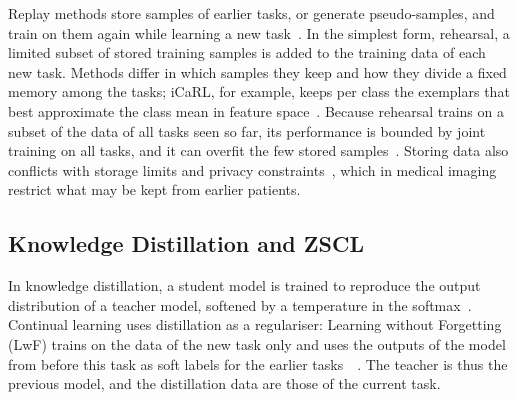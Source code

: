 Replay methods store samples of earlier tasks, or generate pseudo-samples, and train on them again while learning a new task~\cite[Sec.~3.1]{delange2022}.
In the simplest form, rehearsal, a limited subset of stored training samples is added to the training data of each new task.
Methods differ in which samples they keep and how they divide a fixed memory among the tasks; iCaRL, for example, keeps per class the exemplars that best approximate the class mean in feature space~\cite[Sec.~3.1]{delange2022}.
Because rehearsal trains on a subset of the data of all tasks seen so far, its performance is bounded by joint training on all tasks, and it can overfit the few stored samples~\cite[Sec.~3.1]{delange2022}.
Storing data also conflicts with storage limits and privacy constraints~\cite[Sec.~1]{delange2022}, which in medical imaging restrict what may be kept from earlier patients.

\subsection{Knowledge Distillation and ZSCL}
\label{subsec:bg-zscl}

In knowledge distillation, a student model is trained to reproduce the output distribution of a teacher model, softened by a temperature in the softmax~\cite[Sec.~2]{hinton2015distilling}.
Continual learning uses distillation as a regulariser: Learning without Forgetting (LwF) trains on the data of the new task only and uses the outputs of the model from before this task as soft labels for the earlier tasks~\cite{li2017learningforgetting}~\cite[Sec.~3.2.1]{delange2022}.
The teacher is thus the previous model, and the distillation data are those of the current task.

